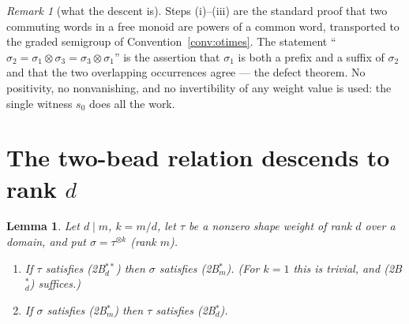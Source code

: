\documentclass[11pt]{article}
\newtheorem{lemma}[theorem]{Lemma}
\theoremstyle{definition}
\theoremstyle{remark}
\newtheorem{remark}[theorem]{Remark}
\begin{document}
\begin{remark}[what the descent is]
Steps (i)--(iii) are the standard proof that two commuting words in a free monoid are powers
of a common word, transported to the graded semigroup of Convention~\ref{conv:otimes}.  The
statement ``$\sigma_2=\sigma_1\otimes\sigma_3=\sigma_3\otimes\sigma_1$'' is the assertion
that $\sigma_1$ is both a prefix and a suffix of $\sigma_2$ and that the two overlapping
occurrences agree --- the defect theorem.  No positivity, no nonvanishing, and no
invertibility of any weight value is used: the single witness $s_0$ does all the work.
\end{remark}

\section{The two-bead relation descends to rank $d$}\label{sec:descend}

\begin{lemma}\label{lem:descent}
Let $d\mid m$, $k=m/d$, let $\tau$ be a nonzero shape weight of rank $d$ over a domain, and
put $\sigma=\tau^{\otimes k}$ (rank $m$).
\begin{enumerate}
\item[\textup{(a)}] If $\tau$ satisfies \textnormal{(2B$^{**}_d$)} then $\sigma$ satisfies
  \textnormal{(2B$^*_m$)}.  (For $k=1$ this is trivial, and \textnormal{(2B$^{*}_d$)}
  suffices.)
\item[\textup{(b)}] If $\sigma$ satisfies \textnormal{(2B$^*_m$)} then $\tau$ satisfies
  \textnormal{(2B$^*_d$)}.
\end{enumerate}
\end{lemma}
\end{document}
